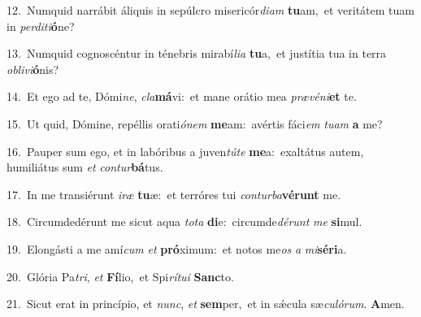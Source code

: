 {\numbfont\textcolor{\numbcolor}{12.}}~Numquid narrábit áliquis in sepúlcro misericór\-\textit{di}\-\textit{am} \textbf{tu}\-am,~\star et veritátem tuam in \textit{per}\-\textit{di}\textit{ti}\textbf{ó}ne?\par
{\numbfont\textcolor{\numbcolor}{13.}}~Numquid cognoscéntur in ténebris mirabí\-\textit{li}\-\textit{a} \textbf{tu}\-a,~\star et justítia tua in terra \textit{ob}\-\textit{li}\textit{vi}\textbf{ó}nis?\par
{\numbfont\textcolor{\numbcolor}{14.}}~Et ego ad te, Dómi\-\textit{ne}\-, \textit{cla}\-\textbf{má}vi:~\star et mane orátio mea \textit{præ}\-\textit{vé}\textit{ni}\textbf{et} te.\par
{\numbfont\textcolor{\numbcolor}{15.}}~Ut quid, Dómine, repéllis orati\-\textit{ó}\-\textit{nem} \textbf{me}\-am:~\star avértis fáci\textit{em} \textit{tu}\-\textit{am} \textbf{a} me?\par
{\numbfont\textcolor{\numbcolor}{16.}}~Pauper sum ego, et in labóribus a juven\-\textit{tú}\-\textit{te} \textbf{me}\-a:~\star exaltátus autem, humiliátus sum \textit{et} \textit{con}\-\textit{tur}\textbf{bá}tus.\par
{\numbfont\textcolor{\numbcolor}{17.}}~In me transiérunt \textit{i}\-\textit{ræ} \textbf{tu}\-æ:~\star et terróres tui \textit{con}\-\textit{tur}\textit{ba}\textbf{vé}\textbf{runt} me.\par
{\numbfont\textcolor{\numbcolor}{18.}}~Circumdedérunt me sicut aqua \textit{to}\-\textit{ta} \textbf{di}\-e:~\star circumde\-\textit{dé}\-\textit{runt} \textit{me} \textbf{si}\-mul.\par
{\numbfont\textcolor{\numbcolor}{19.}}~Elongásti a me amí\textit{cum} \textit{et} \textbf{pró}\-ximum:~\star et notos me\textit{os} \textit{a} \textit{mi}\-\textbf{sé}\textbf{ri}a.\par
{\numbfont\textcolor{\numbcolor}{20.}}~Glória Pa\-\textit{tri}\-, \textit{et} \textbf{Fí}\-lio,~\star et Spi\-\textit{rí}\-\textit{tu}\textit{i} \textbf{Sanc}\-to.\par
{\numbfont\textcolor{\numbcolor}{21.}}~Sicut erat in princípio, et \textit{nunc}\-, \textit{et} \textbf{sem}\-per,~\star et in sǽcula sæ\-\textit{cu}\-\textit{ló}\textit{rum}. \textbf{A}\-men.\par
